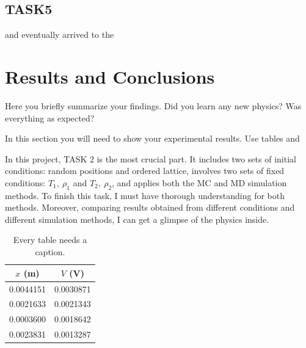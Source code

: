 \documentclass[letterpaper,12pt]{article}
\numberwithin{equation}{section}
\begin{document}
\subsection{TASK5}


and eventually arrived to the



\section{Results and Conclusions}

Here you briefly summarize your findings. Did you learn any new physics? Was everything as expected?

In this section you will need to show your experimental results. Use tables and


In this project, TASK 2 is the most crucial part. It includes two sets of initial conditions: random positions and ordered lattice, involves two sets of fixed conditions: $T_1,\ \rho_1$ and $T_2,\ \rho_2$, and applies both the MC and MD simulation methods. To finish this task, I must have thorough understanding for both methods. Moreover, comparing results obtained from different conditions and different simulation methods, I can get a glimpse of the physics inside. 

\begin{table}[ht]
\begin{center}
\caption{Every table needs a caption.}
\label{tbl:bins} %
\begin{tabular}{|cc|} 
\hline
\multicolumn{1}{|c}{$x$ (m)} & \multicolumn{1}{c|}{$V$ (V)} \\
\hline
0.0044151 &   0.0030871 \\
0.0021633 &   0.0021343 \\
0.0003600 &   0.0018642 \\
0.0023831 &   0.0013287 \\
\hline
\end{tabular}
\end{center}
\end{table}
\end{document}
